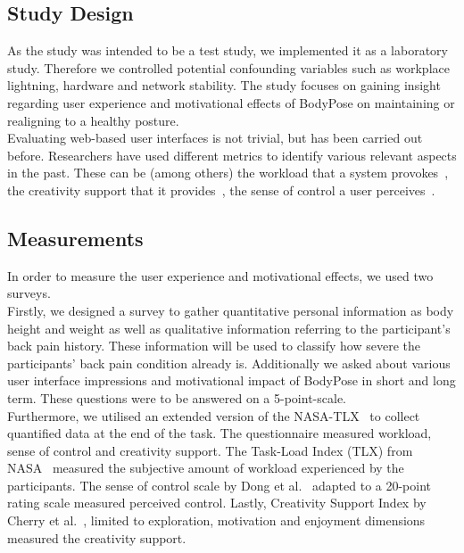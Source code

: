 \subsection{Study Design}
\label{us1-study-design}
As the study was intended to be a test study, we implemented it as a laboratory study. Therefore we controlled potential confounding variables such as workplace lightning, hardware and network stability.
The study focuses on gaining insight regarding user experience and motivational effects of BodyPose on maintaining or realigning to a healthy posture.\\
Evaluating web-based user interfaces is not trivial, but has been carried out before. Researchers have used different metrics to identify various relevant aspects in the past. These can be (among others) the workload that a system provokes~\cite{hart1988development,hart2006nasa}, the creativity support that it provides~\cite{cherry2014quantifying}, the sense of control a user perceives~\cite{dong2015development}.


\subsection{Measurements}
\label{us1-measurements}
In order to measure the user experience and motivational effects, we used two surveys.\\
Firstly, we designed a survey to gather quantitative personal information as body height and weight as well as qualitative information referring to the participant's back pain history. These information will be used to classify how severe the participants' back pain condition already is. Additionally we asked about various user interface impressions and motivational impact of BodyPose in short and long term. These questions were to be answered on a 5-point-scale.\\
Furthermore, we utilised an extended version of the NASA-TLX~\cite{hart2006nasa} to collect quantified data at the end of the task. The questionnaire measured workload, sense of control and creativity support. The Task-Load Index (TLX) from NASA~\cite{hart2006nasa} measured the subjective amount of workload experienced by the participants. The sense of control scale by Dong et al.~\cite{dong2015development} adapted to a 20-point rating scale measured perceived control. Lastly, Creativity Support Index by Cherry et al.~\cite{cherry2014quantifying}, limited to exploration, motivation and enjoyment dimensions measured the creativity support.

